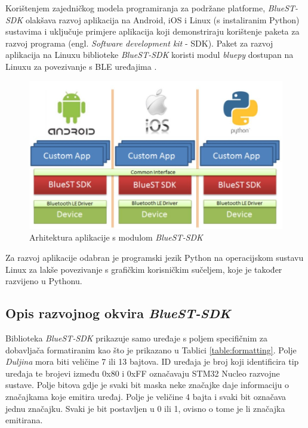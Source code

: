 Korištenjem zajedničkog modela programiranja za podržane platforme, \textit{BlueST-SDK} olakšava razvoj aplikacija na Android, iOS i Linux (s instaliranim Python) sustavima i uključuje primjere aplikacija koji demonstriraju korištenje paketa za razvoj programa (engl. \textit{Software development kit} - SDK). Paket za razvoj aplikacija na Linuxu biblioteke \textit{BlueST-SDK} koristi modul \textit{bluepy} dostupan na Linuxu za povezivanje s BLE uređajima \cite{bluest}. 

\begin{figure}[ht]
	\includegraphics[width=\linewidth]{imgs/bluest_stack}
	\caption{Arhitektura aplikacije s modulom \textit{BlueST-SDK} \cite{bluest}}
	\label{fig:bluest_stack}
\end{figure}


Za razvoj aplikacije odabran je programski jezik Python na operacijskom sustavu Linux za lakše povezivanje s grafičkim korisničkim sučeljem, koje je također razvijeno u Pythonu. 

\subsection{Opis razvojnog okvira \textit{BlueST-SDK}}

Biblioteka \textit{BlueST-SDK} prikazuje samo uređaje s poljem specifičnim za dobavljača formatiranim kao što je prikazano u Tablici \ref{table:formatting}. Polje \textit{Duljina} mora biti veličine 7 ili 13 bajtova. ID uređaja je broj koji identificira tip uređaja te brojevi između 0x80 i 0xFF označavaju STM32 Nucleo razvojne sustave. Polje bitova gdje je svaki bit maska neke značajke daje informaciju o značajkama koje emitira uređaj. Polje je veličine 4 bajta i svaki bit označava jednu značajku. Svaki je bit postavljen u 0 ili 1, ovisno o tome je li značajka emitirana. 

